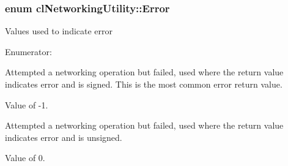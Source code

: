 \hypertarget{classcl_networking_utility_abd62983eb0ed56370b14bd8fe26ff6d3}{
\subsubsection[{Error}]{\setlength{\rightskip}{0pt plus 5cm}enum {\bf clNetworkingUtility::Error}}}
\label{classcl_networking_utility_abd62983eb0ed56370b14bd8fe26ff6d3}
Values used to indicate error \begin{Desc}
\item[Enumerator: ]\par
\begin{description}
\item[{\em 
\hypertarget{classcl_networking_utility_abd62983eb0ed56370b14bd8fe26ff6d3af2155f40db817b2899720ebec3e0a463}{
NET\_\-ERROR}
\label{classcl_networking_utility_abd62983eb0ed56370b14bd8fe26ff6d3af2155f40db817b2899720ebec3e0a463}
}]Attempted a networking operation but failed, used where the return value indicates error and is signed. This is the most common error return value. \par
 Value of -\/1. \item[{\em 
\hypertarget{classcl_networking_utility_abd62983eb0ed56370b14bd8fe26ff6d3ac914d42470ea7c5a72273f0992eaa09d}{
UNSIGNED\_\-NET\_\-ERROR}
\label{classcl_networking_utility_abd62983eb0ed56370b14bd8fe26ff6d3ac914d42470ea7c5a72273f0992eaa09d}
}]Attempted a networking operation but failed, used where the return value indicates error and is unsigned.\par
 Value of 0. \end{description}
\end{Desc}

